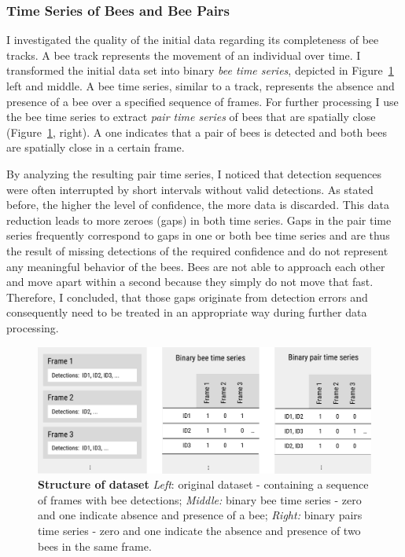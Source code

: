 \subsubsection{Time Series of Bees and Bee Pairs}
\label{subsec:tracking}
I investigated the quality of the initial data regarding its completeness of bee tracks.
A bee track represents the movement of an individual over time.
I transformed the initial data set into binary \emph{bee time series}, depicted in Figure~\ref{fig:structure} left and middle.
A bee time series, similar to a track, represents the absence and presence of a bee over a specified sequence of frames.
For further processing I use the bee time series to extract \emph{pair time series} of bees that are spatially close (Figure~\ref{fig:structure}, right).
A one indicates that a pair of bees is detected and both bees are spatially close in a certain frame.

By analyzing the resulting pair time series, I noticed that detection sequences were often interrupted by short intervals without valid detections.
As stated before, the higher the level of confidence, the more data is discarded.
This data reduction leads to more zeroes (gaps) in both time series.
Gaps in the pair time series frequently correspond to gaps in one or both bee time series and are thus the result of missing detections of the required confidence and do not represent any meaningful behavior of the bees.
Bees are not able to approach each other and move apart within a second because they simply do not move that fast.
Therefore, I concluded, that those gaps originate from detection errors and consequently need to be treated in an appropriate way during further data processing.

\begin{figure}[tp]
	\centering
	\includegraphics[width=1.0\textwidth]{Figures/structure}
	\caption[Structure of dataset]{\textbf{Structure of dataset} \emph{Left}: original dataset - containing a sequence of frames with bee detections; \emph{Middle:} binary bee time series - zero and one indicate absence and presence of a bee; \emph{Right:} binary pairs time series - zero and one indicate the absence and presence of two bees in the same frame.}
	\label{fig:structure}
\end{figure}